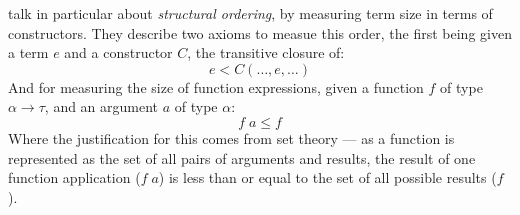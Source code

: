 \citet{PredicateStructrec} talk in particular about \textit{structural ordering}, by measuring term size in
terms of constructors. They describe two axioms to measue this order, the first being given
a term $e$ and a constructor $C$, the transitive closure of:
$$
    e < C (\dots, e, \dots)
$$
And for measuring the size of function expressions, given a function $f$ of type $\alpha \longrightarrow \tau$,
and an argument $a$ of type $\alpha$:
$$
    f\; a \leq f
$$
Where the justification for this comes from set theory --- as a function is represented as the set of all pairs of
arguments and results, the result of one function application ($f\; a$) is less than or equal to the set of
all possible results ($f$).

